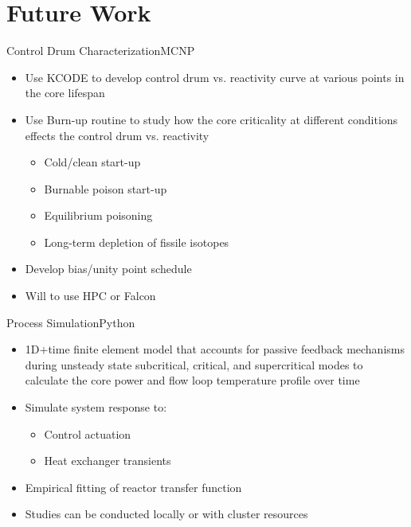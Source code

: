 \documentclass[aspectratio=169,pdftex,dvipsnames]{beamer}
\begin{document}
\section{Future Work}

\begin{frame}{Control Drum Characterization}{MCNP}
    \begin{itemize}
        \item Use KCODE to develop control drum vs. reactivity curve at various points in the core lifespan
        \item Use Burn-up routine to study how the core criticality at different conditions effects the control drum vs. reactivity
        \begin{itemize}
            \item Cold/clean start-up
            \item Burnable poison start-up
            \item Equilibrium poisoning
            \item Long-term depletion of fissile isotopes
        \end{itemize} 
        \item Develop bias/unity point schedule 
        \item Will to use HPC or Falcon
    \end{itemize}
\end{frame}

\begin{frame}{Process Simulation}{Python}
    \begin{itemize}
        \item 1D$+$time finite element model that accounts for passive feedback mechanisms during unsteady state subcritical, critical, and supercritical modes to calculate the core power and flow loop temperature profile over time
        \item Simulate system response to:
        \begin{itemize}
            \item Control actuation
            \item Heat exchanger transients
        \end{itemize}
        \item Empirical fitting of reactor transfer function
        \item Studies can be conducted locally or with cluster resources
    \end{itemize}
\end{frame}
\end{document}
